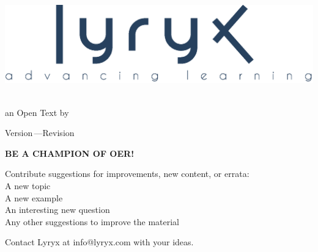 \setcounter{page}{1}
\thispagestyle{empty}
\vspace{-3em}
\begin{center}
	\includegraphics[width=.4\textwidth]{images/LyryxLogo.eps}
\end{center}

\vspace{-2em}

\begin{center}
 {\fontsize{24pt}{22pt}\selectfont \textcolor{titletextcolour}{\booktitle}} \\ 
{\fontsize{16pt}{20pt}\selectfont \textcolor{titlepagecolour}{an Open Text}} {\fontsize{16pt}{20pt}\selectfont\textcolor{titlepagecolour}{ by \bookauthor}}

\smallskip

 {\fontsize{16pt}{20pt}\selectfont\textcolor{titlepagecolour}{Version\,\version \enskip---\enskip Revision\,\revision}} 
\end{center}

\setlength{\parskip}{0pt}

\vfill


\begin{center} 
\fontsize{14pt}{16pt}\selectfont\textcolor{titlepagecolour}{\textbf{BE A CHAMPION OF OER!}}
\end{center}

\begin{center}
Contribute suggestions for improvements, new content, or errata: \\
A new topic \\
A new example \\
An interesting new question \\
Any other suggestions to improve the material

\medskip

\noindent Contact Lyryx at \textcolor{titlepagecolour}{info@lyryx.com} with your ideas.
\end{center}

\vfill

